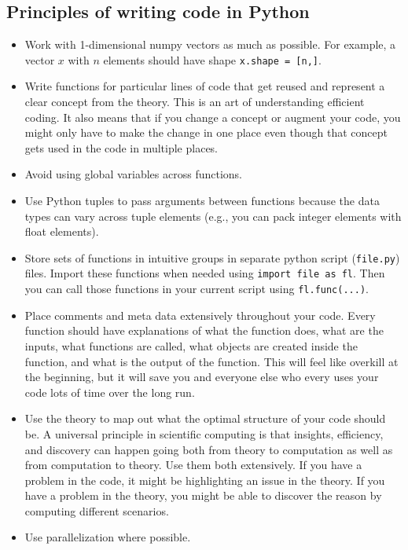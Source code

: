 \documentclass[letterpaper,12pt]{article}
\theoremstyle{definition}
\numberwithin{equation}{section}
\numberwithin{exercise}{section}
\begin{document}
\begin{spacing}{1.5}
\section{Principles of writing code in Python}\label{SecCodePrinc}

   \begin{itemize}
      \item Work with 1-dimensional numpy vectors as much as possible. For example, a vector $x$ with $n$ elements should have shape \texttt{x.shape = [n,]}.
      \item Write functions for particular lines of code that get reused and represent a clear concept from the theory. This is an art of understanding efficient coding. It also means that if you change a concept or augment your code, you might only have to make the change in one place even though that concept gets used in the code in multiple places.
      \item Avoid using global variables across functions.
      \item Use Python tuples to pass arguments between functions because the data types can vary across tuple elements (e.g., you can pack integer elements with float elements).
      \item Store sets of functions in intuitive groups in separate python script (\texttt{file.py}) files. Import these functions when needed using \texttt{import file as fl}. Then you can call those functions in your current script using \texttt{fl.func(...)}.
      \item Place comments and meta data extensively throughout your code. Every function should have explanations of what the function does, what are the inputs, what functions are called, what objects are created inside the function, and what is the output of the function. This will feel like overkill at the beginning, but it will save you and everyone else who every uses your code lots of time over the long run.
      \item Use the theory to map out what the optimal structure of your code should be. A universal principle in scientific computing is that insights, efficiency, and discovery can happen going both from theory to computation as well as from computation to theory. Use them both extensively. If you have a problem in the code, it might be highlighting an issue in the theory. If you have a problem in the theory, you might be able to discover the reason by computing different scenarios.
      \item Use parallelization where possible.
   \end{itemize}



\end{spacing}
\end{document}
